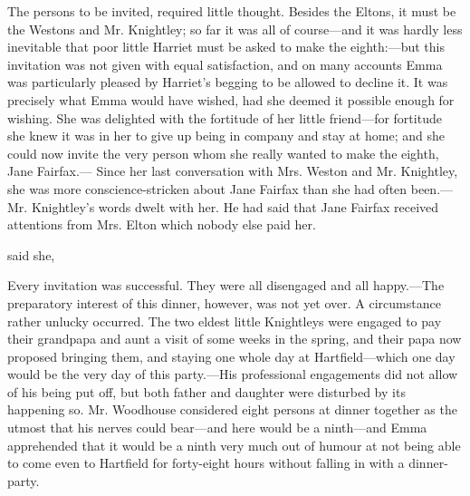 The persons to be invited, required little thought. Besides the Eltons, it must be the Westons and Mr. Knightley; so far it was all of course---and it was hardly less inevitable that poor little Harriet must be asked to make the eighth:---but this invitation was not given with equal satisfaction, and on many accounts Emma was particularly pleased by Harriet's begging to be allowed to decline it.  It was precisely what Emma would have wished, had she deemed it possible enough for wishing. She was delighted with the fortitude of her little friend---for fortitude she knew it was in her to give up being in company and stay at home; and she could now invite the very person whom she really wanted to make the eighth, Jane Fairfax.--- Since her last conversation with Mrs. Weston and Mr. Knightley, she was more conscience-stricken about Jane Fairfax than she had often been.---Mr. Knightley's words dwelt with her. He had said that Jane Fairfax received attentions from Mrs. Elton which nobody else paid her.

 said she, 

Every invitation was successful. They were all disengaged and all happy.---The preparatory interest of this dinner, however, was not yet over. A circumstance rather unlucky occurred. The two eldest little Knightleys were engaged to pay their grandpapa and aunt a visit of some weeks in the spring, and their papa now proposed bringing them, and staying one whole day at Hartfield---which one day would be the very day of this party.---His professional engagements did not allow of his being put off, but both father and daughter were disturbed by its happening so. Mr. Woodhouse considered eight persons at dinner together as the utmost that his nerves could bear---and here would be a ninth---and Emma apprehended that it would be a ninth very much out of humour at not being able to come even to Hartfield for forty-eight hours without falling in with a dinner-party.

